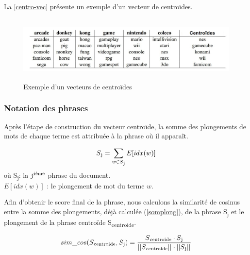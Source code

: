              \vspace*{0.5cm}
             La \autoref{centro-vec} présente un exemple d'un vecteur de centroïdes. 
              \begin{figure}[H]
                 \centering
                \includegraphics[height=95pt,width=420pt]{img/chapter3/centroideembed.jpg}
                \caption{Exemple d'un vecteurs de centroïdes \cite{notreresume}}
                \label{centro-vec}
             \end{figure}
         \vspace*{0.1cm}    
         \subsubsection{Notation des phrases}
         Après l'étape de construction du vecteur centroïde, la somme des plongements de mots de chaque terme  est attribuée à la phrase où il apparaît.\label{somplong}

        \begin{equation*}
         S\textsubscript{j} = \sum_{\substack{w\in S\textsubscript{j}}}
         E[idx(w)]
        \end{equation*}
        où S\textsubscript{j}: la $j\textsuperscript{ième}$ phrase du document. \\ 
        $E[idx(w)]$ : le plongement de mot du terme $w$.

        Afin d'obtenir le score final de la phrase, nous calculons la similarité de cosinus entre la somme des plongements, déjà calculée (\ref{somplong}), de la phrase S\textsubscript{j} et le plongement de la phrase centroïde S\textsubscript{centroide}.
        
        \[sim\_cos(S\textsubscript{centroide},S\textsubscript{j}) = \frac {S\textsubscript{centroide} \cdot S\textsubscript{j}}{||S\textsubscript{centroide}|| \cdot ||S\textsubscript{j}||}\]

